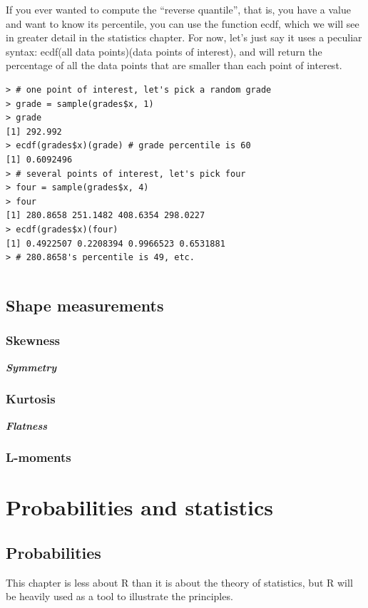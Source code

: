 \documentclass{report}
\newcommand{\code}[1]{\textsf{\ttfamily #1}}
\newcommand{\notefor}[1]{\hfill\textbf{\textit{#1}}}
\begin{document}
		If you ever wanted to compute the ``reverse quantile'', that is, you have a value and want to know its percentile, you can use the function \code{ecdf}, which we will see in greater detail in the statistics chapter. For now, let's just say it uses a peculiar syntax: \code{ecdf(all data points)(data points of interest)}, and will return the percentage of all the data points that are smaller than each point of interest.
		
		\begin{verbatim}
> # one point of interest, let's pick a random grade
> grade = sample(grades$x, 1)
> grade
[1] 292.992
> ecdf(grades$x)(grade) # grade percentile is 60
[1] 0.6092496
> # several points of interest, let's pick four
> four = sample(grades$x, 4)
> four
[1] 280.8658 251.1482 408.6354 298.0227
> ecdf(grades$x)(four)
[1] 0.4922507 0.2208394 0.9966523 0.6531881
> # 280.8658's percentile is 49, etc.
		\end{verbatim}

		
		\begin{verbatim}
		\end{verbatim}
		
	\section{Shape measurements}
		\subsection{Skewness}
		\notefor{Symmetry}
		
		\subsection{Kurtosis}
		\notefor{Flatness}
		
		\subsection{L-moments}

\chapter{Probabilities and statistics}
	\section{Probabilities}
	This chapter is less about R than it is about the theory of statistics, but R will be heavily used as a tool to illustrate the principles.
	
\end{document}
